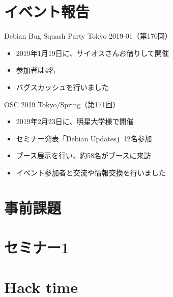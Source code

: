 \section{イベント報告}

\begin{frame}{Debian Bug Squash Party Tokyo 2019-01（第170回）}
\begin{itemize}
\item 2019年1月19日に、サイオスさんお借りして開催
\item 参加者は4名
\item バグスカッシュを行いました
\end{itemize} 
\end{frame}

\begin{frame}{OSC 2019 Tokyo/Spring（第171回）}
\begin{itemize}
\item 2019年2月23日に、明星大学様で開催
\item セミナー発表「Debian Updates」12名参加
\item ブース展示を行い、約58名がブースに来訪
\item イベント参加者と交流や情報交換を行いました
\end{itemize} 
\end{frame}


\section{事前課題}


{\footnotesize
 
}

%

\section{セミナー1}

\section{Hack time}

  
